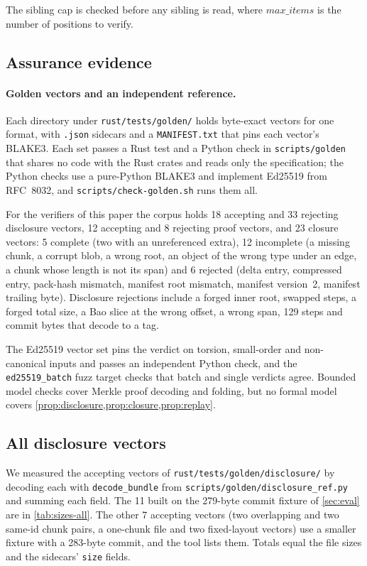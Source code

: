 \documentclass[10pt,letterpaper]{article}
\theoremstyle{remark}
\begin{document}
The sibling cap is checked before any sibling is read, where
$\mathit{max\_items}$ is the number of positions to verify.

\subsection{Assurance evidence}\label{app:assurance}

\paragraph{Golden vectors and an independent reference.}
Each directory under \texttt{rust/tests/golden/} holds byte-exact vectors for
one format, with \texttt{.json} sidecars and a \texttt{MANIFEST.txt} that pins
each vector's BLAKE3. Each set passes a Rust test and a Python check in
\texttt{scripts/golden} that shares no code with the Rust crates and reads only
the specification; the Python checks use a pure-Python BLAKE3 and implement
Ed25519 from RFC~8032, and \texttt{scripts/check-golden.sh} runs them all.

For the verifiers of this paper the corpus holds 18 accepting and 33 rejecting
disclosure vectors, 12 accepting and 8 rejecting proof vectors, and 23 closure
vectors: 5 complete (two with an unreferenced extra), 12 incomplete (a missing
chunk, a corrupt blob, a wrong root, an object of the wrong type under an
edge, a chunk whose length is not its span) and 6 rejected (delta entry, compressed entry,
pack-hash mismatch, manifest root mismatch, manifest version~2, manifest
trailing byte). Disclosure rejections include a forged inner root, swapped
steps, a forged total size, a Bao slice at the wrong offset, a wrong span, 129
steps and commit bytes that decode to a tag.

The Ed25519 vector set pins the verdict on torsion, small-order and
non-canonical inputs and passes an independent Python check, and the
\texttt{ed25519\_batch} fuzz target checks that batch and single verdicts
agree. Bounded model checks cover Merkle proof decoding and folding, but no
formal model covers \cref{prop:disclosure,prop:closure,prop:replay}.

\subsection{All disclosure vectors}\label{app:vectors}

We measured the accepting vectors of \texttt{rust/tests/golden/disclosure/} by
decoding each with \texttt{decode\_bundle} from
\texttt{scripts/golden/disclosure\_ref.py} and summing each field. The 11
built on the 279-byte commit fixture of \cref{sec:eval} are in
\cref{tab:sizes-all}. The other 7 accepting vectors (two overlapping and two
same-id chunk pairs, a one-chunk file and two fixed-layout vectors) use a
smaller fixture with a 283-byte commit, and the tool lists them. Totals equal
the file sizes and the sidecars' \texttt{size} fields.
\end{document}
